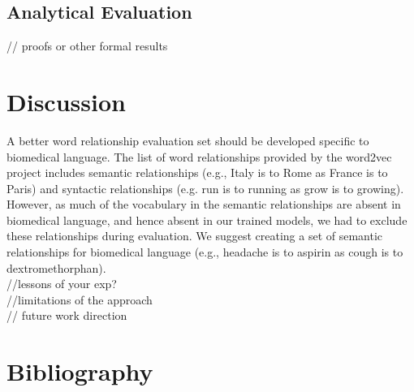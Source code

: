 \documentclass{article}
\begin{document}
\subsection*{Analytical Evaluation}
// proofs or other formal results

\section{Discussion}
A better word relationship evaluation set should be developed specific to biomedical language. The list of word relationships provided by the word2vec project includes semantic relationships (e.g., Italy is to Rome as France is to Paris) and syntactic relationships (e.g. run is to running as grow is to growing). However, as much of the vocabulary in the semantic relationships are absent in biomedical language, and hence absent in our trained models, we had to exclude these relationships during evaluation. We suggest creating a set of semantic relationships for biomedical language (e.g., headache is to aspirin as cough is to dextromethorphan). \\
//lessons of your exp? \\
//limitations of the approach \\
// future work direction \\

\section{Bibliography}
\end{document}
